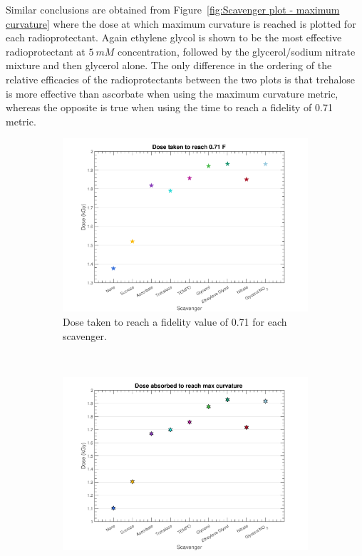 Similar conclusions are obtained from Figure~\ref{fig:Scavenger plot - maximum curvature} where the dose at which maximum curvature is reached is plotted for each radioprotectant. Again ethylene glycol is shown to be the most effective radioprotectant at $5\ mM$ concentration, followed by the glycerol/sodium nitrate mixture and then glycerol alone. The only difference in the ordering of the relative efficacies of the radioprotectants between the two plots is that trehalose is more effective than ascorbate when using the maximum curvature metric, whereas the opposite is true when using the time to reach a fidelity of 0.71 metric.
\begin{figure}
    \centering
    \begin{subfigure}[b]{0.8\textwidth}
            \centering
            \includegraphics[width=\textwidth]{figures/saxs/ScavengerComparisonPlot.pdf}
            \caption{Dose taken to reach a fidelity value of 0.71 for each scavenger.}
            \label{fig:Scavenger plot - arbitrary fidelity value}
    \end{subfigure}
    \\
    \begin{subfigure}[b]{0.8\textwidth}
            \centering
            \includegraphics[width=\textwidth]{figures/saxs/ScavengerCurvatureComparisonPlot.pdf}

\end{subfigure}
\end{figure}
